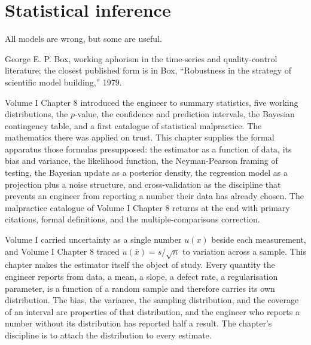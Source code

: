 \chapter{Statistical inference}
\label{vol02:ch14}

\epigraph{All models are wrong, but some are useful.}{George
E. P. Box, working aphorism in the time-series and quality-control
literature; the closest published form is in Box, ``Robustness in
the strategy of scientific model building,'' 1979.}


\noindent
Volume I Chapter 8 introduced the engineer to summary statistics,
five working distributions, the $p$-value, the confidence and
prediction intervals, the Bayesian contingency table, and a first
catalogue of statistical malpractice. The mathematics there was
applied on trust. This chapter supplies the formal apparatus those
formulas presupposed: the estimator as a function of data, its bias
and variance, the likelihood function, the Neyman-Pearson framing
of testing, the Bayesian update as a posterior density, the
regression model as a projection plus a noise structure, and
cross-validation as the discipline that prevents an engineer from
reporting a number their data has already chosen. The malpractice
catalogue of Volume I Chapter 8 returns at the end with primary
citations, formal definitions, and the multiple-comparisons
correction.

\begin{archetype}
Volume I carried uncertainty as a single number $u(x)$ beside each
measurement, and Volume I Chapter 8 traced $u(\bar{x}) = s/\sqrt{n}$
to variation across a sample. This chapter makes the estimator
itself the object of study. Every quantity the engineer reports from
data, a mean, a slope, a defect rate, a regularisation parameter, is
a function of a random sample and therefore carries its own
distribution. The bias, the variance, the sampling distribution, and
the coverage of an interval are properties of that distribution, and
the engineer who reports a number without its distribution has
reported half a result. The chapter's discipline is to attach the
distribution to every estimate.
\end{archetype}

